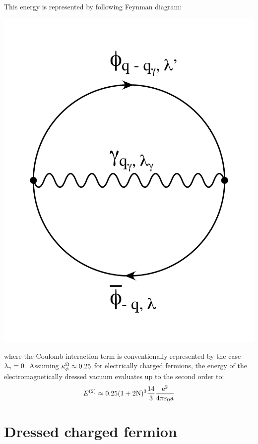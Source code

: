 \documentclass[10pt,a4paper,twoside,openany]{book}
\begin{document}
This energy is represented by following Feynman diagram:
\begin{center}
\includegraphics[scale=0.2]{images/diagrams/Vacuum_Energy_2.pdf}
\end{center}
where the Coulomb interaction term is conventionally  represented by the case $\lambda_\gamma = 0$.
Assuming $\kappa^\Omega_\phi \approx 0.25$ for electrically charged fermions, the energy of the electromagnetically dressed vacuum evaluates up to the second order to:
\begin{equation*}
E^{(2)} \approx 0.25 ( 1 + 2 \mathrm N )^3 \frac {14} 3 \frac{\mathrm e^2}{4 \pi \mathrm \varepsilon_0 \mathrm a}
\end{equation*}

\section{Dressed charged fermion}

\end{document}
